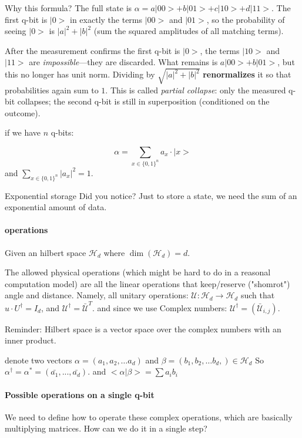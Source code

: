 \begin{insight}
Why this formula? The full state is $\alpha = a|00> + b|01> + c|10> + d|11>$.
The first q-bit is $|0>$ in exactly the terms $|00>$ and $|01>$, so the probability of seeing $|0>$ is $|a|^2+|b|^2$ (sum the squared amplitudes of all matching terms).

After the measurement confirms the first q-bit is $|0>$, the terms $|10>$ and $|11>$
are \emph{impossible}---they are discarded.
What remains is $a|00> + b|01>$, but this no longer has unit norm.
Dividing by $\sqrt{|a|^2+|b|^2}$ \textbf{renormalizes} it so that probabilities again sum to $1$.
This is called \emph{partial collapse}: only the measured q-bit collapses; the second q-bit is still in superposition (conditioned on the outcome).
\end{insight}


if we have $n$ q-bits:

$$\alpha=\sum_{x\in\{0,1\}^n} {a_x\cdot |x>}$$ and $\sum_{x\in\{0,1\}^n} |a_x|^2=1$.


\begin{bclogo}[logo=\bcattention, couleurBarre=orange, noborder=true, couleur=white]{Exponential storage}
    Did you notice? Just to store a state, we need the sum of an exponential amount of data.
\end{bclogo}

\paragraph{operations}
Given an hilbert space $\mathcal{H}_d$ where $\dim(\mathcal{H}_d)=d$.

The allowed physical operations (which might be hard to do in a reasonal computation model) are all the linear operations that keep/reserve ("shomrot") angle and distance. Namely, all unitary operations: $\mathcal{U}:\mathcal{H}_d\to \mathcal{H}_d$ 
such that $u\cdot U^\dagger=I_d$, and $\mathcal{U}^\dagger=\bar{\mathcal{U}}^T$.
and since we use Complex numbers: 
$\mathcal{U}^\dagger=(\bar{\mathcal{U}}_{i,j})$.

Reminder: Hilbert space is a vector space over the complex numbers with an inner product.

denote two vectors $\alpha =(a_1,a_2,\dots a_d)$ and $\beta=(b_1,b_2,\dots b_d,) \in \mathcal{H}_d$
So $\alpha^\dagger=\alpha^*=(\bar{a_1},...,\bar{a_d})$. 
and $<\alpha | \beta > =\sum{a_ib_i}$



\paragraph{Possible operations on a single q-bit}
We need to define how to operate these complex operations, which are basically multiplying matrices. 
How can we do it in a single step?

